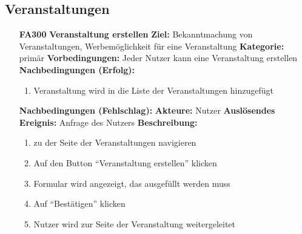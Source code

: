 \documentclass[parskip=full]{scrartcl}
\begin{document}
		\subsection{Veranstaltungen} \label{sec:FAVeranstaltungen}
		\begin{itemize}[nosep]
			
			\item[\textbf{FA300}]\textbf{Veranstaltung erstellen}
				\newline \textbf{Ziel:} Bekanntmachung von Veranstaltungen, Werbemöglichkeit für eine Veranstaltung
				\newline \textbf{Kategorie:} primär
				\newline \textbf{Vorbedingungen:} Jeder Nutzer kann eine Veranstaltung erstellen
				\newline \textbf{Nachbedingungen (Erfolg):} 
				\begin{enumerate}[nosep]
					\item Veranstaltung wird in die Liste der Veranstaltungen hinzugefügt 
				\end{enumerate}
				\textbf{Nachbedingungen (Fehlschlag):}
				\newline \textbf{Akteure:} Nutzer
				\newline \textbf{Auslösendes Ereignis:} Anfrage des Nutzers
				\newline \textbf{Beschreibung:}
				\begin{enumerate}[nosep]
					\item zu der Seite der Veranstaltungen navigieren
					\item Auf den Button “Veranstaltung erstellen” klicken
					\item Formular wird angezeigt, das ausgefüllt werden muss
					\item Auf “Bestätigen” klicken
					\item Nutzer wird zur Seite der Veranstaltung weitergeleitet\\
				\end{enumerate}
				

\end{itemize}
\end{document}
